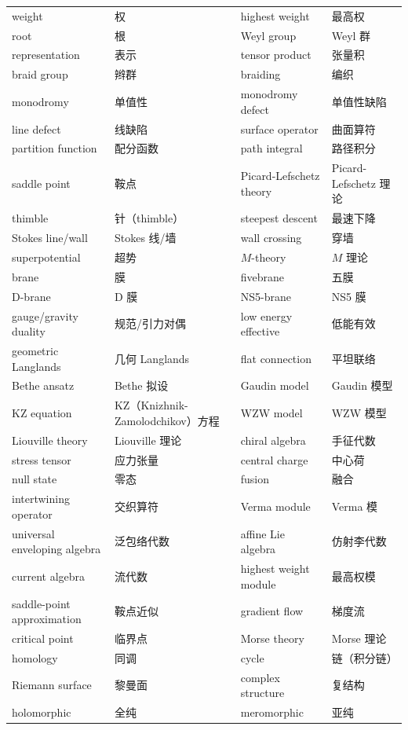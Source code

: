 \begin{longtable}{p{}p{}p{}p{}}
weight & 权 & highest weight & 最高权 \\
root & 根 & Weyl group & Weyl 群 \\
representation & 表示 & tensor product & 张量积 \\
braid group & 辫群 & braiding & 编织 \\
monodromy & 单值性 & monodromy defect & 单值性缺陷 \\
line defect & 线缺陷 & surface operator & 曲面算符 \\
partition function & 配分函数 & path integral & 路径积分 \\
saddle point & 鞍点 & Picard-Lefschetz theory & Picard-Lefschetz 理论 \\
thimble & 针（thimble） & steepest descent & 最速下降 \\
Stokes line/wall & Stokes 线/墙 & wall crossing & 穿墙 \\
superpotential & 超势 & $M$-theory & $M$ 理论 \\
brane & 膜 & fivebrane & 五膜 \\
D-brane & D 膜 & NS5-brane & NS5 膜 \\
gauge/gravity duality & 规范/引力对偶 & low energy effective & 低能有效 \\
geometric Langlands & 几何 Langlands & flat connection & 平坦联络 \\
Bethe ansatz & Bethe 拟设 & Gaudin model & Gaudin 模型 \\
KZ equation & KZ（Knizhnik-Zamolodchikov）方程 & WZW model & WZW 模型 \\
Liouville theory & Liouville 理论 & chiral algebra & 手征代数 \\
stress tensor & 应力张量 & central charge & 中心荷 \\
null state & 零态 & fusion & 融合 \\
intertwining operator & 交织算符 & Verma module & Verma 模 \\
universal enveloping algebra & 泛包络代数 & affine Lie algebra & 仿射李代数 \\
current algebra & 流代数 & highest weight module & 最高权模 \\
saddle-point approximation & 鞍点近似 & gradient flow & 梯度流 \\
critical point & 临界点 & Morse theory & Morse 理论 \\
homology & 同调 & cycle & 链（积分链） \\
Riemann surface & 黎曼面 & complex structure & 复结构 \\
holomorphic & 全纯 & meromorphic & 亚纯 \\

\end{longtable}
